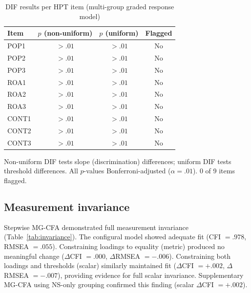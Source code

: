 \documentclass[pdflatex,sn-apa]{sn-jnl}%
\begin{document}
\begin{table}[ht]
\caption{DIF results per HPT item (multi-group graded response model)}\label{tab:dif}
\begin{tabular*}{\textwidth}{@{\extracolsep\fill}lccc}
\toprule
Item & $p$ (non-uniform) & $p$ (uniform) & Flagged \\
\midrule
POP1 & $> .01$ & $> .01$ & No \\
POP2 & $> .01$ & $> .01$ & No \\
POP3 & $> .01$ & $> .01$ & No \\
ROA1 & $> .01$ & $> .01$ & No \\
ROA2 & $> .01$ & $> .01$ & No \\
ROA3 & $> .01$ & $> .01$ & No \\
CONT1 & $> .01$ & $> .01$ & No \\
CONT2 & $> .01$ & $> .01$ & No \\
CONT3 & $> .01$ & $> .01$ & No \\
\bottomrule
\end{tabular*}
\begin{tablenotes}
\small
\item Non-uniform DIF tests slope (discrimination) differences; uniform DIF tests threshold differences. All $p$-values Bonferroni-adjusted ($\alpha = .01$). 0 of 9 items flagged.
\end{tablenotes}
\end{table}

\subsection{Measurement invariance}\label{subsec:invariance}

Stepwise MG-CFA demonstrated full measurement invariance (Table~\ref{tab:invariance}). The configural model showed adequate fit (CFI $= .978$, RMSEA $= .055$). Constraining loadings to equality (metric) produced no meaningful change ($\Delta$CFI $= .000$, $\Delta$RMSEA $= -.006$). Constraining both loadings and thresholds (scalar) similarly maintained fit ($\Delta$CFI $= +.002$, $\Delta$RMSEA $= -.007$), providing evidence for full scalar invariance. Supplementary MG-CFA using NS-only grouping confirmed this finding (scalar $\Delta$CFI $= +.002$).
\end{document}
